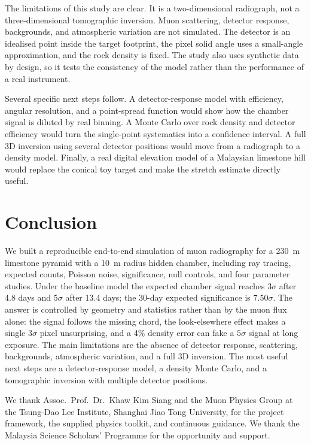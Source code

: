 \documentclass{article}
\begin{document}
The limitations of this study are clear. It is a two-dimensional radiograph,
not a three-dimensional tomographic inversion. Muon scattering, detector
response, backgrounds, and atmospheric variation are not simulated. The
detector is an idealised point inside the target footprint, the pixel solid
angle uses a small-angle approximation, and the rock density is fixed. The
study also uses synthetic data by design, so it tests the consistency of the
model rather than the performance of a real instrument.

Several specific next steps follow. A detector-response model with efficiency,
angular resolution, and a point-spread function would show how the chamber
signal is diluted by real binning. A Monte Carlo over rock density and detector
efficiency would turn the single-point systematics into a confidence interval.
A full 3D inversion using several detector positions would move from a
radiograph to a density model. Finally, a real digital elevation model of a
Malaysian limestone hill would replace the conical toy target and make the
stretch estimate directly useful.

\section{Conclusion}

We built a reproducible end-to-end simulation of muon radiography for a
230~m limestone pyramid with a 10~m radius hidden chamber, including ray
tracing, expected counts, Poisson noise, significance, null controls, and four
parameter studies. Under the baseline model the expected chamber signal reaches
$3\sigma$ after 4.8 days and $5\sigma$ after 13.4 days; the 30-day expected
significance is $7.50\sigma$. The answer is controlled by geometry and
statistics rather than by the muon flux alone: the signal follows the missing
chord, the look-elsewhere effect makes a single $3\sigma$ pixel unsurprising,
and a 4\% density error can fake a $5\sigma$ signal at long exposure. The main
limitations are the absence of detector response, scattering, backgrounds,
atmospheric variation, and a full 3D inversion. The most useful next steps are
a detector-response model, a density Monte Carlo, and a tomographic inversion
with multiple detector positions.

\begin{ack}
We thank Assoc.\ Prof.\ Dr.\ Khaw Kim Siang and the Muon Physics Group at the
Tsung-Dao Lee Institute, Shanghai Jiao Tong University, for the project
framework, the supplied physics toolkit, and continuous guidance. We thank the
Malaysia Science Scholars' Programme for the opportunity and support.
\end{ack}
\end{document}
